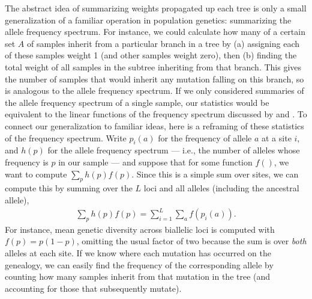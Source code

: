 \documentclass{article}
\begin{document}
The abstract idea of summarizing weights propagated up each tree
is only a small generalization of a familiar operation in population genetics:
summarizing the allele frequency spectrum.
For instance, we could calculate how many of a certain set $A$ of samples
inherit from a particular branch in a tree
by (a) assigning each of these samples weight 1 (and other samples weight zero), then
(b) finding the total weight of all samples in the subtree inheriting from that branch.
This gives the number of samples that would inherit any mutation falling on this branch,
so is analogous to the allele frequency spectrum.
If we only considered summaries of the allele frequency spectrum of a single sample,
our statistics would be equivalent to the linear functions of the frequency spectrum
discussed by \citet{fu1995statistical} and \citet{achaz2009frequency}.
To connect our generalization to familiar ideas,
here is a reframing of these statistics of the frequency spectrum.
Write $p_i(a)$ for the frequency of allele $a$ at a site $i$,
and $h(p)$ for the allele frequency spectrum
--- i.e., the number of alleles whose frequency is $p$ in our sample ---
and suppose that for some function $f()$, we want to compute $\sum_p h(p) f(p)$.
Since this is a simple sum over sites,
we can compute this by summing over the $L$ loci and all alleles
(including the ancestral allele),
\begin{align*}
    \sum_p h(p) f(p) = \sum_{i=1}^L \sum_a f(p_i(a)).
\end{align*}
For instance, mean genetic diversity across biallelic loci is computed with $f(p) = p (1-p)$,
omitting the usual factor of two because the sum is over \emph{both} alleles at each site.
If we know where each mutation has occurred on the genealogy,
we can easily find the frequency of the corresponding allele by counting how many samples
inherit from that mutation in the tree (and accounting for those that subsequently mutate).
\end{document}
